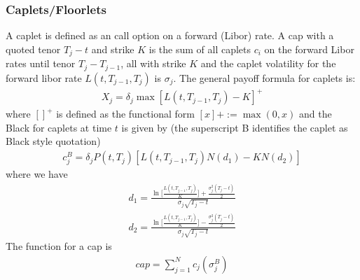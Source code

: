 \documentclass[11pt]{article}
\numberwithin{equation}{subsection}
\begin{document}
\subsubsection{Caplets/Floorlets}
A caplet is defined as an call option on a forward (Libor) rate. A cap with a quoted tenor \(T_{j}-t\) and strike \(K\) is the sum of all caplets \(c_i\) on the forward Libor rates until tenor \(T_{j}-T_{j-1}\), all with strike \(K\) and the caplet volatility for the forward libor rate \(L(t, T_{j-1}, T_{j})\) is \(\sigma_{j}\). The general payoff formula for caplets is:
\begin{eqnarray*}
X_j = \delta_{j} \max[L(t, T_{j-1}, T_j)-K]^{+}
\end{eqnarray*}
where \([]^+\) is defined as the functional form \([x]+ := \max(0, x)\) and the Black for caplets at time \(t\) is given by (the superscript B identifies the caplet as Black style quotation)
\begin{eqnarray}
c_j^{B} = \delta_{j} P(t, T_{j}) [L(t, T_{j-1}, T_j)N(d_1) -K N(d_2)]
\end{eqnarray}
where we have 
\begin{eqnarray}
	d_1 = \frac{\ln\bigg[\frac{L(t, T_{j-1}, T_j)}{K}\bigg]+\frac{\sigma_j^2(T_j-t)}{2}}{\sigma_j\sqrt{T_j-t}}
\end{eqnarray}
\begin{eqnarray}
	d_2 = \frac{\ln\bigg[\frac{L(t, T_{j-1}, T_j)}{K}\bigg]-\frac{\sigma_j^2(T_j-t)}{2}}{\sigma_j\sqrt{T_j-t}}
\end{eqnarray}
The function for a cap is
\begin{eqnarray}
	cap = \sum_{j=1}^{N} c_{j}(\sigma_{j}^{B})
\end{eqnarray}
\end{document}
